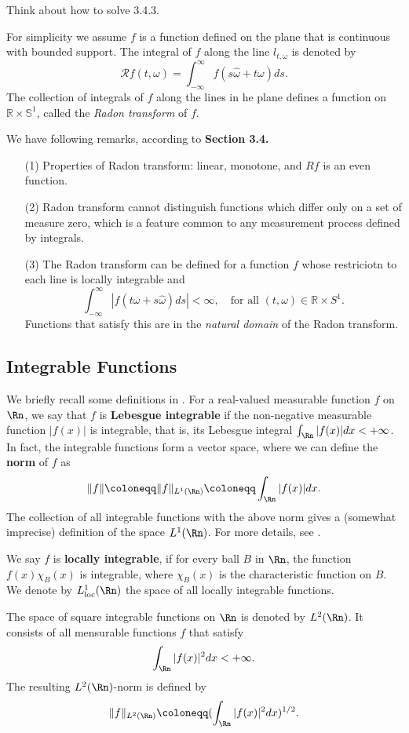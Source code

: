 \begin{Exercise}  
Think about how to solve 3.4.3.
\end{Exercise}

\begin{Definition} For simplicity we assume $f$ is a function defined on the plane that is continuous with bounded support. The integral of $f$ along the line $l_{t,\omega}$ is denoted by 
\[\mathscr R f(t,\omega) = \int_{-\infty}^{\infty} f(s\hat{\omega}+t\omega)ds.\]
The collection of integrals of $f$ along the lines in he plane defines a function on $\mathbb R\times \mathbb S^1$, called the \textit{Radon transform} of $f$.
\end{Definition}

\begin{remark} We have following remarks, according to \textbf{Section 3.4.}
\begin{itemize}
    \item[(1)] Properties of Radon transform: linear, monotone, and $Rf$ is an even function.
    \item[(2)] Radon transform cannot distinguish functions which differ only on a set of measure zero, which is a feature common to any measurement process defined by integrals. 
    \item[(3)] The Radon transform can be defined for a function $f$ whose restriciotn to each line is locally integrable and 
    \[
    \int_{-\infty}^{\infty} |f(t\omega + s \hat{\omega}) d s | < \infty, \quad \text{for all } (t, \omega) \in \mathbb{R} \times S^1.
    \]
    Functions that satisfy this are in the \textit{natural domain} of the Radon transform.
\end{itemize}
\end{remark}

\subsection{Integrable Functions}
We briefly recall some definitions in \cite[Chap 2 \& 3]{stein2009real}. 
For a real-valued measurable function $f$ on $\Rn$, we say that $f$ is \textbf{Lebesgue integrable} if the non-negative measurable function $|f(x)|$ is integrable, that is, its Lebesgue integral $\int_{\Rn}  |f(x)| d x < +\infty$. 
In fact, the integrable functions form a vector space, where we can define the \textbf{norm} of $f$ as
\[
\|f\| \coloneqq \|f\|_{L^1(\Rn)} \coloneqq \int_{\Rn} |f(x)| dx.
\]
The collection of all integrable functions with the above norm gives a (somewhat imprecise) definition of the space $L^1(\Rn)$. For more details, see \cite[Section 2.2]{stein2009real}.

We say $f$ is \textbf{locally integrable}, if for every ball $B$ in $\Rn$, the function $f(x) \chi_B(x)$ is integrable, where $\chi_B(x)$ is the characteristic function on $B$.
We denote by $L^1_\mathrm{loc}(\Rn)$ the space of all locally integrable functions.

The space of square integrable functions on $\Rn$ is denoted by $L^2(\Rn)$.
It consists of all mensurable functions $f$ that satisfy 
\[
\int_{\Rn} |f(x)|^2 d x < +\infty.
\]
The resulting $L^2(\Rn)$-norm is defined by 
\[
\|f\|_{L^2
(\Rn)} \coloneqq (\int_{\Rn} |f(x)|^2 d x)^{1/2}.
\]